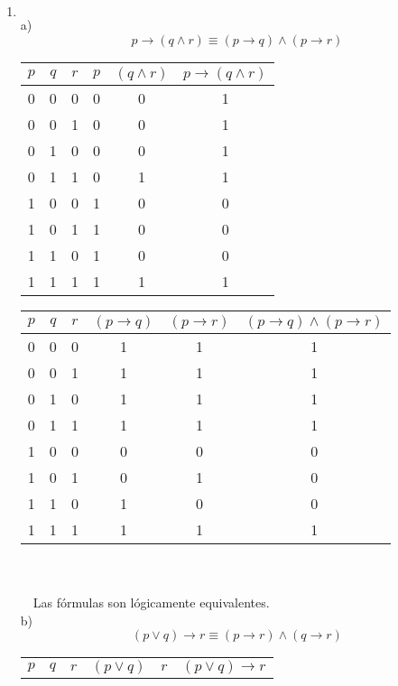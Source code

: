 \documentclass[11pt]{utalcaDoc}
\begin{document}
\subsection{ } %
\begin{enumerate}
\item \[ \]
a)
	\[ p \to (q \wedge r) \equiv (p \to q) \wedge (p \to r)\]
\begin{tabular}{|c|c|c||c|c|c|}
\hline 
$p$ & $q$ & $r$ & $p$ & $(q \wedge r)$ & $p \to (q \wedge r)$ \\ 
\hline 
0 & 0 & 0 & 0 & 0 & 1 \\ 
\hline 
0 & 0 & 1 & 0 & 0 & 1 \\ 
\hline 
0 & 1 & 0 & 0 & 0 & 1 \\ 
\hline 
0 & 1 & 1 & 0 & 1 & 1 \\ 
\hline 
1 & 0 & 0 & 1 & 0 & 0 \\ 
\hline 
1 & 0 & 1 & 1 & 0 & 0 \\ 
\hline 
1 & 1 & 0 & 1 & 0 & 0 \\ 
\hline 
1 & 1 & 1 & 1 & 1 & 1 \\ 
\hline 
\end{tabular} 
\begin{tabular}{|c|c|c||c|c|c|}
\hline 
$p$ & $q$ & $r$ & $(p \to q)$ & $(p \to r)$ & $(p \to q) \wedge (p \to r)$ \\ 
\hline 
0 & 0 & 0 & 1 & 1 & 1 \\ 
\hline 
0 & 0 & 1 & 1 & 1 & 1 \\ 
\hline 
0 & 1 & 0 & 1 & 1 & 1 \\ 
\hline 
0 & 1 & 1 & 1 & 1 & 1 \\ 
\hline 
1 & 0 & 0 & 0 & 0 & 0 \\ 
\hline 
1 & 0 & 1 & 0 & 1 & 0 \\ 
\hline 
1 & 1 & 0 & 1 & 0 & 0 \\ 
\hline 
1 & 1 & 1 & 1 & 1 & 1 \\ 
\hline 
\end{tabular} 
\\ \\ \ \ 
Las fórmulas son lógicamente equivalentes.
\[ \]
b)
	\[ (p \lor q) \to r \equiv (p \to r) \wedge (q \to r) \]
\begin{tabular}{|c|c|c||c|c|c|}
\hline 
$p$ & $q$ & $r$ & $(p \lor q)$ & $r$ & $(p \lor q) \to r$ \\ 

\end{tabular}
\end{enumerate}
\end{document}
